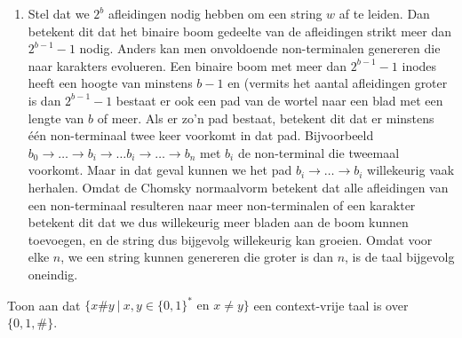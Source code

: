 \documentclass[a4paper]{article}
\newtheorem{lemma}{Lemma}
\begin{document}
\begin{question}
\begin{answer}
\begin{enumerate}
\begin{lemma}
 \end{lemma}
 \item Stel dat we $2^b$ afleidingen nodig hebben om een string $w$ af te leiden. Dan betekent dit dat het binaire boom gedeelte van de afleidingen strikt meer dan $2^{b-1}-1$ nodig. Anders kan men onvoldoende non-terminalen genereren die naar karakters evolueren. Een binaire boom met meer dan $2^{b-1}-1$ inodes heeft een hoogte van minstens $b-1$ en (vermits het aantal afleidingen groter is dan $2^{b-1}-1$ bestaat er ook een pad van de wortel naar een blad met een lengte van $b$ of meer. Als er zo'n pad bestaat, betekent dit dat er minstens \'e\'en non-terminaal twee keer voorkomt in dat pad. Bijvoorbeeld $b_0\rightarrow\ldots\rightarrow b_i\rightarrow\ldots b_i\rightarrow\ldots\rightarrow b_n$ met $b_i$ de non-terminal die tweemaal voorkomt. Maar in dat geval kunnen we het pad $b_i\rightarrow\ldots\rightarrow b_i$ willekeurig vaak herhalen. Omdat de Chomsky normaalvorm betekent dat alle afleidingen van een non-terminaal resulteren naar meer non-terminalen of een karakter betekent dit dat we dus willekeurig meer bladen aan de boom kunnen toevoegen, en de string dus bijgevolg willekeurig kan groeien. Omdat voor elke $n$, we een string kunnen genereren die groter is dan $n$, is de taal bijgevolg oneindig.
\end{enumerate}
\end{answer}
\end{question}

\begin{question}
Toon aan dat $\{ x \# y \ | \ \text{$x,y \in \{0,1\}^*$ en $x \neq y$} \}$ een context-vrije taal is over $\{ 0,1,\# \}$.
\begin{answer}
\end{answer}
\end{question}
\end{document}
